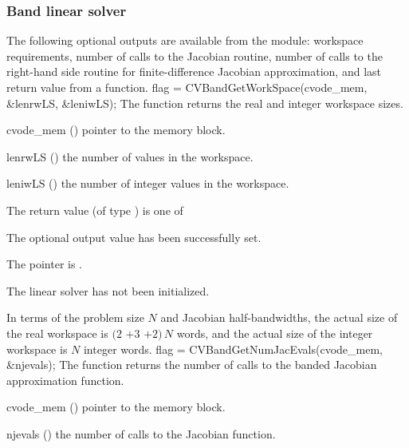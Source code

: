 \subsubsection{Band linear solver}\label{sss:optout_band}
The following optional outputs are available from the {\cvband} module:
workspace requirements, number of calls to the Jacobian routine, number of 
calls to the right-hand side routine for finite-difference Jacobian approximation,
and last return value from a {\cvband} function.
{
  flag = CVBandGetWorkSpace(cvode\_mem, \&lenrwLS, \&leniwLS);
}
{
  The function  returns the
  {\cvband} real and integer workspace sizes.
}
{
  \begin{args}
  \item[cvode\_mem] ()
    pointer to the {\cvode} memory block.
  \item[lenrwLS] ()
    the number of  values in the {\cvband} workspace.
  \item[leniwLS] ()
    the number of integer values in the {\cvband} workspace.
  \end{args}
}
{
  The return value  (of type ) is one of
  \begin{args}
  \item[\Id{CVBAND\_SUCCESS}] 
    The optional output value has been successfully set.
  \item[\Id{CVBAND\_MEM\_NULL}]
    The  pointer is .
  \item[\Id{CVBAND\_LMEM\_NULL}]
    The {\cvband} linear solver has not been initialized.
  \end{args}
}
{
  In terms of the problem size $N$ and Jacobian half-bandwidths, 
  the actual size of the real workspace is
  $(2$ $+ 3$  $+ 2)\, N$  words,
  and the actual size of the integer workspace is $N$ integer words.
}
{
  flag = CVBandGetNumJacEvals(cvode\_mem, \&njevals);
}
{
  The function  returns the
  number of calls to the banded Jacobian approximation function.
}
{
  \begin{args}
  \item[cvode\_mem] ()
    pointer to the {\cvode} memory block.
  \item[njevals] ()
    the number of calls to the Jacobian function.
  \end{args}
}
